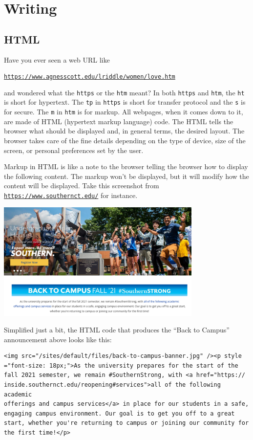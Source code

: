 \chapter{Writing}
\label{ch:write}

\section{HTML}
\label{sec:html}

Have you ever seen a web URL like 
\begin{center}
\href{https://www.agnesscott.edu/lriddle/women/love.htm}{\tt https://www.agnesscott.edu/lriddle/women/love.htm}
\end{center}

\noindent and wondered what the \texttt{https} or the \texttt{htm}
meant? In both \texttt{https} and \texttt{htm}, the \texttt{ht} is
short for hypertext. The \texttt{tp} in \texttt{https} is short for
transfer protocol and the \texttt{s} is for secure. The \texttt{m}
in \texttt{htm} is for markup. All webpages, when it comes down to
it, are made of HTML (hypertext markup language) code. The HTML tells
the browser what should be displayed and, in general terms, the desired
layout. The browser takes care of the fine details depending on the
type of device, size of the screen, or personal preferences set by
the user.

Markup in HTML is like a note to the browser telling the browser how
to display the following content. The markup won't be displayed, but
it will modify how the content will be displayed. Take this screenshot
from \texttt{\href{https://www.southernct.edu/}{https://www.southernct.edu/}}
for instance.
\begin{center}
\includegraphics[width=4in]{SCSUscreenshot}
\par\end{center}

\noindent Simplified just a bit, the HTML code that produces the ``Back
to Campus'' announcement above looks like this:
\begin{verbatim}
<img src="/sites/default/files/back-to-campus-banner.jpg" /><p style
="font-size: 18px;">As the university prepares for the start of the
fall 2021 semester, we remain #SouthernStrong, with <a href="https://
inside.southernct.edu/reopening#services">all of the following academic
offerings and campus services</a> in place for our students in a safe,
engaging campus environment. Our goal is to get you off to a great
start, whether you're returning to campus or joining our community for
the first time!</p>
\end{verbatim}

